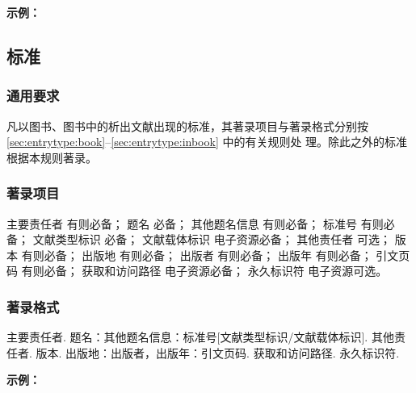 \documentclass[twoside]{article}%
\begin{document}

\begin{refsection}

\nocite{中国互联网络信息中心2012--}
\nocite{汤万金2013-09-30--,中国宏观2020蓝皮书,美国疾病2018黄皮书,中国信息2023白皮书}
\nocite{Calkin2011-8-9}
\nocite{DTFHA1990--}
\nocite{WHO1970--,UN2024DT}


\textbf{示例：}

{\printbibliography[heading=none,env=indentegenv]}
\end{refsection}


\subsection{标准}

\subsubsection{通用要求}

凡以图书、图书中的析出文献出现的标准，其著录项目与著录格式分别按 \ref{sec:entrytype:book}--\ref{sec:entrytype:inbook} 中的有关规则处
理。除此之外的标准根据本规则著录。

\subsubsection{著录项目}

主要责任者 有则必备；
题名 必备；
其他题名信息 有则必备；
标准号 有则必备；
文献类型标识 必备；
文献载体标识 电子资源必备；
其他责任者 可选；
版本 有则必备；
出版地 有则必备；
出版者 有则必备；
出版年 有则必备；
引文页码 有则必备；
获取和访问路径 电子资源必备；
永久标识符 电子资源可选。

\subsubsection{著录格式}
主要责任者. 题名：其他题名信息：标准号[文献类型标识/文献载体标识]. 其他责任者. 版本.
出版地：出版者，出版年：引文页码. 获取和访问路径. 永久标识符.

\begin{refsection}

\nocite{全国信息文献标准化技术委员会2010-3-3}
\nocite{全国广播电视标准化技术委员会2007-1-1}
\nocite{水电水利2020,国家环境保护局科技标准司1996-2-3,
中国铁建2021,华北水利2022,网络安全2021,国家标准局信息分类编码研究所1988-59-92}
\nocite{Auditdata2019,Softwareinterface2021,
Informationtechnology2020,Lithiumbattery2022,
Explosiveatmospheres2016,Atmospheresexplosives2016}


\textbf{示例：}

{\printbibliography[heading=none,env=indentegenv]}
\end{refsection}
\end{document}
